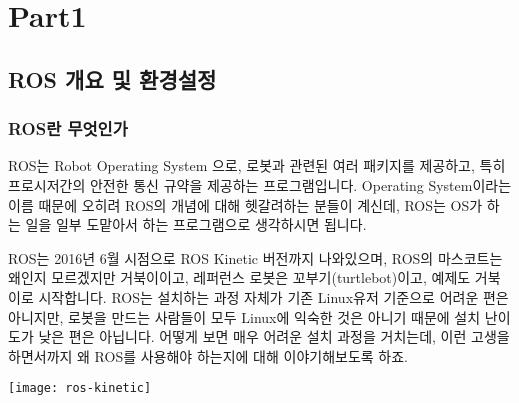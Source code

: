 \documentclass[11pt,fleqn]{book} %
\begin{document}
\pagestyle{empty} %

\tableofcontents %

\cleardoublepage %

\pagestyle{fancy} %


\part{Part1}



\chapter{ROS 개요 및 환경설정}

\section{ROS란 무엇인가}


ROS는 Robot Operating System 으로, 로봇과 관련된 여러 패키지를 제공하고,
특히 프로시저간의 안전한 통신 규약을 제공하는 프로그램입니다.
Operating System이라는 이름 때문에 오히려 ROS의 개념에 대해 헷갈려하는 분들이 계신데,
ROS는 OS가 하는 일을 일부 도맡아서 하는 프로그램으로 생각하시면 됩니다.

ROS는 2016년 6월 시점으로 ROS Kinetic 버전까지 나와있으며, ROS의 마스코트는 왜인지 모르겠지만 거북이이고,
레퍼런스 로봇은 꼬부기(turtlebot)이고, 예제도 거북이로 시작합니다. ROS는 설치하는 과정 자체가 기존 Linux유저 기준으로 어려운 편은 아니지만,
로봇을 만드는 사람들이 모두 Linux에 익숙한 것은 아니기 때문에 설치 난이도가 낮은 편은 아닙니다.
어떻게 보면 매우 어려운 설치 과정을 거치는데, 이런 고생을 하면서까지 왜 ROS를 사용해야 하는지에 대해 이야기해보도록 하죠.

\texttt{[image: ros-kinetic]}
\end{document}
